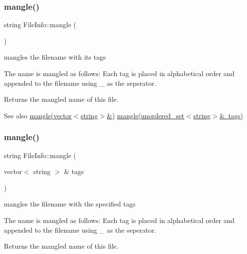 \subsubsection{\texorpdfstring{mangle()}{mangle()}\hspace{0.1cm}{\footnotesize\ttfamily [1/3]}}
{\footnotesize\ttfamily string File\+Info\+::mangle (\begin{DoxyParamCaption}{ }\end{DoxyParamCaption})}



mangles the filename with its tags 

The name is mangled as follows\+: Each tag is placed in alphabetical order and appended to the filename using \textquotesingle{}\+\_\+\textquotesingle{} as the seperator.

\begin{DoxyReturn}{Returns}
the mangled name of this file. 
\end{DoxyReturn}
\begin{DoxySeeAlso}{See also}
\mbox{\hyperlink{class_file_info_a105ad751f21bead6fc2a76e79cb3b701}{mangle(vector$<$string$>$\&)}} \mbox{\hyperlink{class_file_info_aec8a60addbed54097f6cac0a6a516717}{mangle(unordered\+\_\+set$<$string$>$\& tags)}} 
\end{DoxySeeAlso}
\mbox{\label{class_file_info_a105ad751f21bead6fc2a76e79cb3b701}} 
\subsubsection{\texorpdfstring{mangle()}{mangle()}\hspace{0.1cm}{\footnotesize\ttfamily [2/3]}}
{\footnotesize\ttfamily string File\+Info\+::mangle (\begin{DoxyParamCaption}\item[{vector$<$ string $>$ \&}]{tags }\end{DoxyParamCaption})}



mangles the filename with the specified tags 

The name is mangled as follows\+: Each tag is placed in alphabetical order and appended to the filename using \textquotesingle{}\+\_\+\textquotesingle{} as the seperator. \begin{DoxyReturn}{Returns}
the mangled name of this file. 
\end{DoxyReturn}

